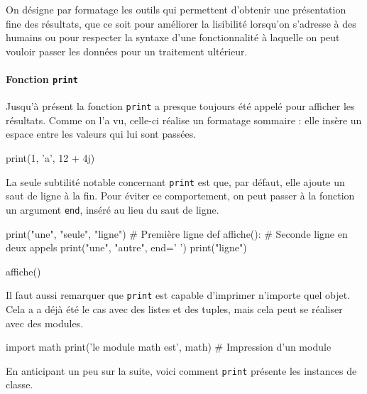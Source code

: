 On désigne par formatage les outils qui permettent d'obtenir une présentation fine des résultats, que ce soit pour améliorer la lisibilité lorsqu'on s'adresse à des humains ou pour respecter la syntaxe d'une fonctionnalité à laquelle on peut vouloir passer les données pour un traitement ultérieur.

\paragraph{Fonction {\normalfont\texttt{print}}}
Jusqu'à présent la fonction \texttt{print} a presque toujours été appelé pour afficher les résultats. Comme on l'a vu, celle-ci réalise un formatage sommaire : elle insère un espace entre les valeurs qui lui sont passées.

\begin{idleconsole}
	\begin{pyconsole}
		print(1, 'a', 12 + 4j)
\end{pyconsole}
\end{idleconsole}

La seule subtilité notable concernant \texttt{print} est que, par défaut, elle ajoute un saut de ligne à la fin. Pour éviter ce comportement, on peut passer à la fonction un argument \texttt{end}, inséré au lieu du saut de ligne.

\begin{idleconsole}
\begin{pyconsole}
print("une", "seule", "ligne") # Première ligne
def affiche(): # Seconde ligne en deux appels
	print("une", "autre", end=' ') 
	print("ligne")

affiche()
\end{pyconsole}
\end{idleconsole}

Il faut aussi remarquer que \texttt{print} est capable d'imprimer n'importe quel objet. Cela a a déjà été le cas avec des listes et des tuples, mais cela peut se réaliser avec des modules.

\begin{idleconsole}
	\begin{pyconsole}
		import math
		print('le module math est', math) # Impression d'un module
\end{pyconsole}
\end{idleconsole}

En anticipant un peu sur la suite, voici comment \texttt{print} présente les instances de classe.

